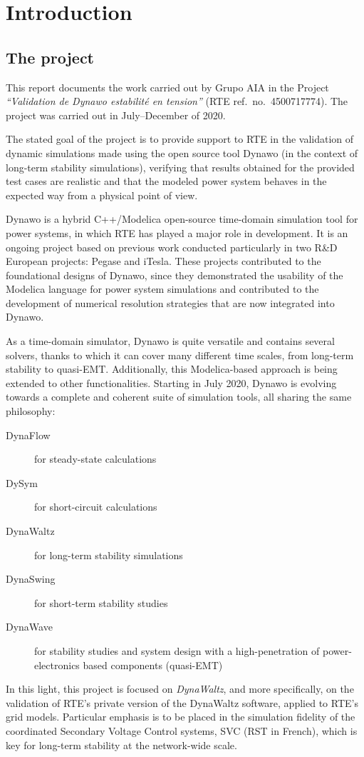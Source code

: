 \documentclass[11pt, a4paper, twoside, titlepage]{article}
\begin{document}
\tableofcontents

\section{Introduction}

\subsection{The project}
This report documents the work carried out by Grupo AIA in the Project
\emph{``Validation de Dynawo estabilité en tension''} (RTE
ref.\ no.\ 4500717774). The project was carried out in July--December
of 2020.

The stated goal of the project is to provide support to RTE in the
validation of dynamic simulations made using the open source tool
Dynawo (in the context of long-term stability simulations), verifying
that results obtained for the provided test cases are realistic and
that the modeled power system behaves in the expected way from a
physical point of view.

Dynawo is a hybrid C++/Modelica open-source time-domain simulation
tool for power systems, in which RTE has played a major role in
development. It is an ongoing project based on previous work conducted
particularly in two R\&D European projects: Pegase and iTesla.  These
projects contributed to the foundational designs of Dynawo, since they
demonstrated the usability of the Modelica language for power system
simulations and contributed to the development of numerical resolution
strategies that are now integrated into Dynawo.

As a time-domain simulator, Dynawo is quite versatile and contains
several solvers, thanks to which it can cover many different time
scales, from long-term stability to quasi-EMT. Additionally, this
Modelica-based approach is being extended to other
functionalities. Starting in July 2020, Dynawo is evolving towards a
complete and coherent suite of simulation tools, all sharing the same
philosophy:
\begin{description}
\item[DynaFlow] for steady-state calculations
\item[DySym] for short-circuit calculations
\item[DynaWaltz] for long-term stability simulations
\item[DynaSwing] for short-term stability studies
\item[DynaWave] for stability studies and system design with a
  high-penetration of power-electronics based components (quasi-EMT)
\end{description}
In this light, this project is focused on \emph{DynaWaltz}, and more
specifically, on the validation of RTE's private version of the
DynaWaltz software, applied to RTE's grid models. Particular emphasis
is to be placed in the simulation fidelity of the coordinated
Secondary Voltage Control systems, SVC (RST in French), which is key
for long-term stability at the network-wide scale.
\end{document}
